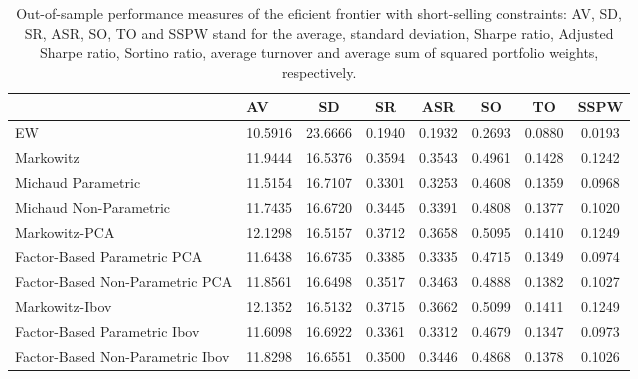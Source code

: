 \begin{table}

\caption{\label{tab:empirical_ef_2}Out-of-sample performance measures of the eficient frontier with short-selling constraints: AV, SD, SR, ASR, SO, TO and SSPW stand for the average, standard deviation, Sharpe ratio, Adjusted Sharpe ratio, Sortino ratio, average turnover and average sum of squared portfolio weights, respectively.}
\centering
\begin{tabular}[t]{l|l|c|c|c|c|c|c}
\hline
  & AV & SD & SR & ASR & SO & TO & SSPW\\
\hline
EW & 10.5916 & 23.6666 & 0.1940 & 0.1932 & 0.2693 & 0.0880 & 0.0193\\
\hline
Markowitz & 11.9444 & 16.5376 & 0.3594 & 0.3543 & 0.4961 & 0.1428 & 0.1242\\
\hline
Michaud Parametric & 11.5154 & 16.7107 & 0.3301 & 0.3253 & 0.4608 & 0.1359 & 0.0968\\
\hline
Michaud Non-Parametric & 11.7435 & 16.6720 & 0.3445 & 0.3391 & 0.4808 & 0.1377 & 0.1020\\
\hline
Markowitz-PCA & 12.1298 & 16.5157 & 0.3712 & 0.3658 & 0.5095 & 0.1410 & 0.1249\\
\hline
Factor-Based Parametric PCA & 11.6438 & 16.6735 & 0.3385 & 0.3335 & 0.4715 & 0.1349 & 0.0974\\
\hline
Factor-Based Non-Parametric PCA & 11.8561 & 16.6498 & 0.3517 & 0.3463 & 0.4888 & 0.1382 & 0.1027\\
\hline
Markowitz-Ibov & 12.1352 & 16.5132 & 0.3715 & 0.3662 & 0.5099 & 0.1411 & 0.1249\\
\hline
Factor-Based Parametric Ibov & 11.6098 & 16.6922 & 0.3361 & 0.3312 & 0.4679 & 0.1347 & 0.0973\\
\hline
Factor-Based Non-Parametric Ibov & 11.8298 & 16.6551 & 0.3500 & 0.3446 & 0.4868 & 0.1378 & 0.1026\\
\hline
\end{tabular}
\end{table}
